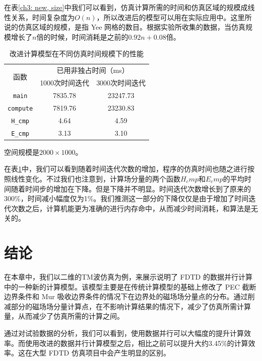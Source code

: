 在表\ref{ch3: new, size}中我们可以看到，仿真计算所需的时间和仿真区域的规模成线性关系，时间复杂度为$O(n)$，所以改进后的模型可以用在实际应用中。这里所说的仿真区域的规模，是指 Yee 网格的数目。根据实验所收集的数据，当仿真规模增长了$n$倍的时候，时间消耗是之前的$0.92n+0.08$倍。

\begin{table}[hp]
	\centering
	\begin{threeparttable}
		\caption{改进计算模型在不同仿真时间规模下的性能}\label{ch3: new, time}
		\begin{tabular}{ccc}
			\toprule
			\multirow{2}{2em}{函数}&\multicolumn{2}{c}{已用非独占时间（ms）}\\ 
			\cline{2-3}
			& 1000次时间迭代 & 3000次时间迭代\\ 
			
			\midrule
			\lstinline|main| & 7835.78 & 23247.73 \\ 
			\lstinline|compute| & 7819.76 & 23230.83\\ 
			\lstinline|H_cmp|& 4.64 & 4.59\\ 
			\lstinline|E_cmp|& 3.13 & 3.10\\
			\bottomrule
		\end{tabular}
		\begin{tablenotes}
			\item[1] 空间规模是$2000\times1000$。
		\end{tablenotes}
	\end{threeparttable}
\end{table}

在表\ref{ch3: new, time}中，我们可以看到随着时间迭代次数的增加，程序的仿真时间也随之进行按照线性变化。不过我们也注意到，计算场分量的两个函数$H_cmp$和$E_cmp$的平均时间随着时间步的增加在下降。但是下降并不明显。时间迭代次数增长到了原来的300\%，时间减小幅度仅为1\%。我们推测这一部分的下降仅仅是由于增加了时间迭代次数之后，计算机能更为准确的进行内存命中，从而减少时间消耗，和算法是无关的。

\section{结论}

在本章中，我们以二维的TM波仿真为例，来展示说明了 FDTD 的数据并行计算中的一种新的计算模型。该模型主要是在传统计算模型的基础上修改了 PEC 截断边界条件和 Mur 吸收边界条件的情况下在边界处的磁场场分量点的分布。通过削减部分的磁场场分量计算点，在不影响计算结果的情况下，减少了仿真所需计算量，从而减少了仿真所需的计算之间。

通过对试验数据的分析，我们可以看到，使用数据并行可以大幅度的提升计算效率。而使用改进的数据并行计算模型之后，相比之前可以提升大约3.45\%的计算效率。这在大型 FDTD 仿真项目中会产生明显的区别。